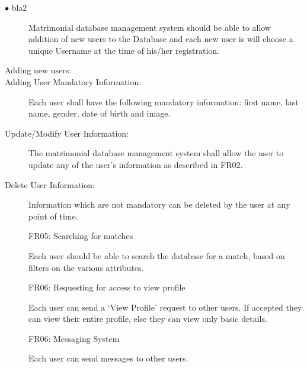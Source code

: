 \documentclass[12pt]{report}
\begin{document}
\begin{description}
\item[$\bullet$ bla2] Matrimonial database management system should be able to allow addition of new users to the Database and each new user is will choose a unique Username at the time of his/her registration.
\item [Adding new users:]
 

\item [Adding User Mandatory Information:]
Each user shall have the following mandatory information: first name, last name, gender, date of birth and image. 

\item [Update/Modify User Information:]
The matrimonial database management system shall allow the user to update any of the user’s information as described in FR02. 

\item [Delete User Information:] 

Information which are not mandatory can be deleted by the user at any point of time. 

FR05: Searching for matches 

Each user should be able to search the database for a match, based on filters on the various attributes. 

FR06: Requesting for access to view profile

Each user can send a ‘View Profile’ request to other users. If accepted they can view their entire profile, else they can view only basic details. 

 FR06: Messaging System 

Each user can send messages to other users. 



\end{description}
\end{document}
